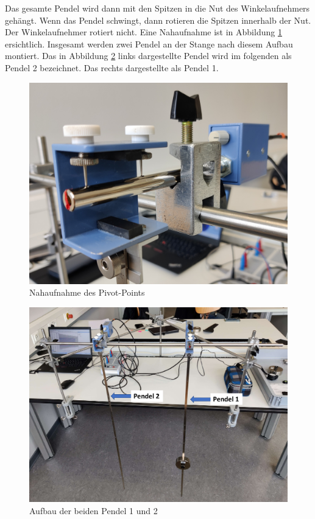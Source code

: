 Das gesamte Pendel wird dann mit den Spitzen in die Nut des Winkelaufnehmers gehängt. Wenn das Pendel schwingt, dann rotieren die Spitzen innerhalb der Nut. Der Winkelaufnehmer rotiert nicht. Eine Nahaufnahme ist in Abbildung \ref{fig:nahaufnahme_pivotpoint} ersichtlich.
Insgesamt werden zwei Pendel an der Stange nach diesem Aufbau montiert. Das in Abbildung \ref{fig:aufbau_pendel1_pendel2} links dargestellte Pendel wird im folgenden als Pendel 2 bezeichnet. Das rechts dargestellte als Pendel 1.  \\
\begin{figure}[H]
	\centering
	\includegraphics[width=1\textwidth]{nahaufnahme_pivotpoint.jpg}
	\caption{Nahaufnahme des Pivot-Points}
	\label{fig:nahaufnahme_pivotpoint}
\end{figure}
\begin{figure}[H]
	\centering
	\includegraphics[width=1\textwidth]{aufbau_pendel1_pendel2.png}
	\caption{Aufbau der beiden Pendel 1 und 2}
	\label{fig:aufbau_pendel1_pendel2}
\end{figure}

